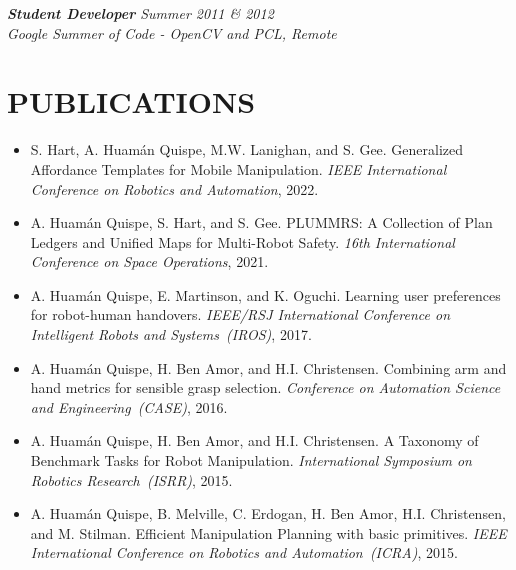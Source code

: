 \documentclass[margin]{res}
\begin{document}
\begin{resume}
                {\sl \textbf{Student Developer} \hfill            Summer 2011 \& 2012} \\
                {\sl Google Summer of Code - OpenCV and PCL, Remote}


\section{PUBLICATIONS}

				
                \begin{itemize}
                    \setlength \itemsep{0em}
                    \item S. Hart, A. Huam\'{a}n Quispe, M.W. Lanighan, and S. Gee. Generalized Affordance Templates for Mobile Manipulation. {\em IEEE International Conference on Robotics and Automation}, 2022.
                    
                    \item A. Huam\'{a}n Quispe, S. Hart, and S. Gee. PLUMMRS: A Collection of Plan Ledgers and Unified Maps for Multi-Robot Safety. {\em 16th International Conference on Space Operations}, 2021.
                      
                    \item A. Huam\'{a}n Quispe, E. Martinson, and K. Oguchi. Learning user preferences for robot-human handovers. {\em IEEE/RSJ International Conference on Intelligent Robots and Systems~(IROS)}, 2017.
                      
                    \item A. Huam\'{a}n Quispe, H. Ben Amor, and H.I. Christensen. Combining arm and hand metrics for sensible grasp selection. {\em Conference on Automation Science and Engineering~(CASE)}, 2016.
                    
                    \item A. Huam\'{a}n Quispe, H. Ben Amor, and H.I. Christensen. A Taxonomy of Benchmark Tasks for Robot Manipulation. {\em International Symposium on Robotics Research~(ISRR)}, 2015.
                    
                    \item A. Huam\'{a}n Quispe, B. Melville, C. Erdogan, H. Ben Amor, H.I. Christensen, and M. Stilman. Efficient Manipulation Planning with basic primitives. {\em IEEE International Conference on Robotics and Automation~(ICRA)}, 2015.
                    

\end{itemize}
\end{resume}
\end{document}
